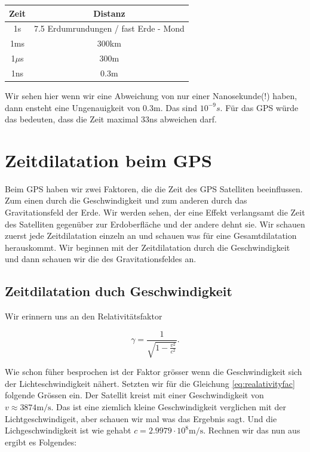 \begin{refsection}
\begin{center}
\begin{tabular}{| c | c |}
\hline
Zeit & Distanz \\
\hline
1s & 7.5 Erdumrundungen / fast Erde - Mond \\

1ms & 300km \\

1$\mu$s & 300m \\

1ns & 0.3m \\
\hline
\end{tabular}
\end{center}

\noindent{}Wir sehen hier wenn wir eine Abweichung von nur einer Nanosekunde(!) haben, dann ensteht eine Ungenauigkeit von 0.3m. Das sind \(10^{-9}s\). Für das GPS würde das bedeuten, dass die Zeit maximal 33ns abweichen darf.

\section{Zeitdilatation beim GPS}
Beim GPS haben wir zwei Faktoren, die die Zeit des GPS Satelliten beeinflussen. Zum einen durch die Geschwindigkeit und zum anderen durch das Gravitationsfeld der Erde. Wir werden sehen, der eine Effekt verlangsamt die Zeit des Satelliten gegenüber zur Erdoberfläche und der andere dehnt sie. Wir schauen zuerst jede Zeitdilatation einzeln an und schauen was für eine Gesamtdilatation herauskommt. Wir beginnen mit der Zeitdilatation durch die Geschwindigkeit und dann schauen wir die des Gravitationsfeldes an.

\subsection{Zeitdilatation duch Geschwindigkeit}
Wir erinnern uns an den Relativitätsfaktor

\begin{equation}
\label{eq:realativityfac}
\gamma = \frac{1}{\sqrt{1 - \frac{v^2}{c^2}}}.
\end{equation}

\noindent{}Wie schon füher besprochen ist der Faktor grösser wenn die Geschwindigkeit sich der Lichteschwindigkeit nähert. Setzten wir für die Gleichung \eqref{eq:realativityfac} folgende Grössen ein. Der Satellit kreist mit einer Geschwindigkeit von \(v \approx 3874 \text{m/s} \). Das ist eine ziemlich kleine Geschwindigkeit verglichen mit der Lichtgeschwindigeit, aber schauen wir mal was das Ergebnis sagt. Und die Lichgeschwindigkeit ist wie gehabt \(c = 2.9979 \cdot 10^8 \text{m/s}\). 
Rechnen wir das nun aus ergibt es Folgendes:\\


\end{refsection}
